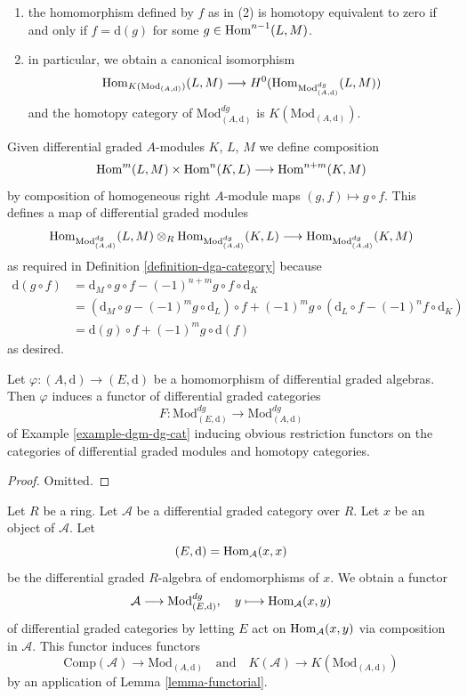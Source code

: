 \begin{example}
\begin{enumerate}
\item the homomorphism defined by $f$ as in (2) is homotopy equivalent
to zero if and only if $f = \text{d}(g)$ for some
$g \in \mathop{\mathrm{Hom}}\nolimits^{n - 1}(L, M)$.
\item in particular, we obtain a canonical isomorphism
$$
\mathop{\mathrm{Hom}}\nolimits_{K(\text{Mod}_{(A, \text{d})})}(L, M)
\longrightarrow
H^0(\mathop{\mathrm{Hom}}\nolimits_{\text{Mod}^{dg}_{(A, \text{d})}}(L, M))
$$
and the homotopy category of $\text{Mod}^{dg}_{(A, \text{d})}$ is
$K(\text{Mod}_{(A, \text{d})})$.
\end{enumerate}
Given differential graded $A$-modules $K$, $L$, $M$ we define
composition
$$
\mathop{\mathrm{Hom}}\nolimits^m(L, M) \times \mathop{\mathrm{Hom}}\nolimits^n(K, L) \longrightarrow \mathop{\mathrm{Hom}}\nolimits^{n + m}(K, M)
$$
by composition of homogeneous right $A$-module maps $(g, f) \mapsto g \circ f$.
This defines a map of differential graded modules
$$
\mathop{\mathrm{Hom}}\nolimits_{\text{Mod}^{dg}_{(A, \text{d})}}(L, M) \otimes_R
\mathop{\mathrm{Hom}}\nolimits_{\text{Mod}^{dg}_{(A, \text{d})}}(K, L) \longrightarrow
\mathop{\mathrm{Hom}}\nolimits_{\text{Mod}^{dg}_{(A, \text{d})}}(K, M)
$$
as required in
Definition \ref{definition-dga-category}
because
\begin{align*}
\text{d}(g \circ f) & =
\text{d}_M \circ g \circ f - (-1)^{n + m} g \circ f \circ \text{d}_K \\
& =
\left(\text{d}_M \circ g - (-1)^m g \circ \text{d}_L\right) \circ f +
(-1)^m g \circ \left(\text{d}_L \circ f - (-1)^n f \circ \text{d}_K\right) \\
& =
\text{d}(g) \circ f + (-1)^m g \circ \text{d}(f)
\end{align*}
as desired.
\end{example}

\begin{lemma}
\label{lemma-homomorphism-induces-dga-functor}
Let $\varphi : (A, \text{d}) \to (E, \text{d})$ be a homomorphism of
differential graded algebras. Then $\varphi$ induces a functor of differential
graded categories
$$
F :
\text{Mod}^{dg}_{(E, \text{d})}
\longrightarrow
\text{Mod}^{dg}_{(A, \text{d})}
$$
of Example \ref{example-dgm-dg-cat} inducing obvious restriction functors
on the categories of differential graded modules and homotopy categories.
\end{lemma}

\begin{proof}
Omitted.
\end{proof}

\begin{lemma}
\label{lemma-construction}
Let $R$ be a ring. Let $\mathcal{A}$ be a differential graded category
over $R$. Let $x$ be an object of $\mathcal{A}$. Let
$$
(E, \text{d}) = \mathop{\mathrm{Hom}}\nolimits_\mathcal{A}(x, x)
$$
be the differential graded $R$-algebra of endomorphisms of $x$.
We obtain a functor
$$
\mathcal{A} \longrightarrow \text{Mod}^{dg}_{(E, \text{d})},\quad
y \longmapsto \mathop{\mathrm{Hom}}\nolimits_\mathcal{A}(x, y)
$$
of differential graded categories by letting $E$ act on
$\mathop{\mathrm{Hom}}\nolimits_\mathcal{A}(x, y)$ via composition in $\mathcal{A}$.
This functor induces functors
$$
\text{Comp}(\mathcal{A}) \to \text{Mod}_{(A, \text{d})}
\quad\text{and}\quad
K(\mathcal{A}) \to K(\text{Mod}_{(A, \text{d})})
$$
by an application of Lemma \ref{lemma-functorial}.
\end{lemma}


